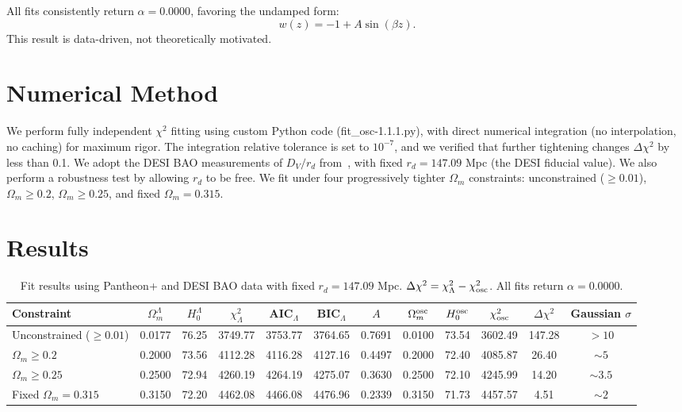 \documentclass[10pt,a4paper,twocolumn]{article}
\begin{document}
All fits consistently return $\alpha=0.0000$, favoring the undamped form:
\[
w(z) = -1 + A\sin(\beta z).
\]
This result is data-driven, not theoretically motivated.

\section{Numerical Method}
We perform fully independent $\chi^2$ fitting using custom Python code (fit\_osc-1.1.1.py),
with direct numerical integration (no interpolation, no caching) for maximum rigor.
The integration relative tolerance is set to $10^{-7}$, and we verified that further tightening changes $\Delta\chi^2$ by less than 0.1.
We adopt the DESI BAO measurements of $D_V/r_d$ from~\cite{DESI2024}, with fixed $r_d = 147.09$ Mpc (the DESI fiducial value).
We also perform a robustness test by allowing $r_d$ to be free.
We fit under four progressively tighter $\Omega_m$ constraints:
unconstrained ($\ge0.01$), $\Omega_m\ge0.2$, $\Omega_m\ge0.25$, and fixed $\Omega_m=0.315$.

\section{Results}
\begin{table}[ht]
\centering
\caption{Fit results using Pantheon+ and DESI BAO data with fixed $r_d=147.09$ Mpc.
$\Delta\chi^2 = \chi^2_{\Lambda} - \chi^2_{\rm osc}$.
All fits return $\alpha=0.0000$.}
\label{tab:results}
\begin{tabular}{lcccccccccc>{\bfseries}c}
\toprule
Constraint
& $\Omega_m^\Lambda$ & $H_0^\Lambda$ & $\chi^2_\Lambda$
& AIC$_\Lambda$ & BIC$_\Lambda$
& $A$ & $\Omega_m^{\rm osc}$ & $H_0^{\rm osc}$ & $\chi^2_{\rm osc}$
& $\Delta\chi^2$ & Gaussian $\sigma$ \\
\midrule
Unconstrained ($\ge0.01$)
& 0.0177 & 76.25 & 3749.77
& 3753.77 & 3764.65
& 0.7691 & 0.0100 & 73.54 & 3602.49
& 147.28 & $>10$ \\
$\Omega_m\ge0.2$
& 0.2000 & 73.56 & 4112.28
& 4116.28 & 4127.16
& 0.4497 & 0.2000 & 72.40 & 4085.87
& 26.40 & $\sim5$ \\
$\Omega_m\ge0.25$
& 0.2500 & 72.94 & 4260.19
& 4264.19 & 4275.07
& 0.3630 & 0.2500 & 72.10 & 4245.99
& 14.20 & $\sim3.5$ \\
Fixed $\Omega_m=0.315$
& 0.3150 & 72.20 & 4462.08
& 4466.08 & 4476.96
& 0.2339 & 0.3150 & 71.73 & 4457.57
& 4.51 & $\sim2$ \\
\bottomrule
\end{tabular}
\end{table}
\end{document}
